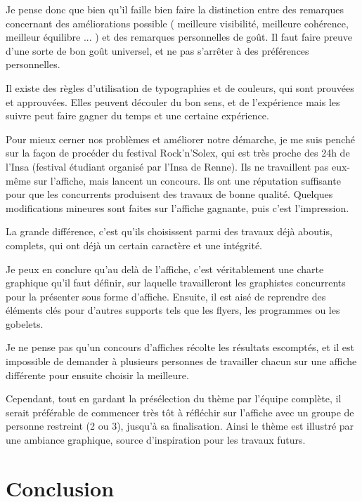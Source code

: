         Je pense donc que bien qu'il faille bien faire la distinction entre des remarques concernant des améliorations possible ( meilleure visibilité, meilleure cohérence, meilleur équilibre ... ) et des remarques personnelles de goût.
        Il faut faire preuve d'une sorte de bon goût universel, et ne pas s'arrêter à des préférences personnelles.
        
        Il existe des règles d'utilisation de typographies et de couleurs, qui sont prouvées  et approuvées. Elles peuvent découler du bon sens, et de l'expérience mais les suivre peut faire gagner du temps et une certaine expérience.

        
        Pour mieux cerner nos problèmes et améliorer notre démarche, je me suis penché sur la façon de procéder du festival Rock'n'Solex, qui est très proche des 24h de l'Insa (festival étudiant organisé par l'Insa de Renne).
        Ils ne travaillent pas eux-même sur l'affiche, mais lancent un concours. Ils ont une réputation suffisante pour que les concurrents produisent des travaux de bonne qualité.
        Quelques modifications mineures sont faites sur l'affiche gagnante, puis c'est l'impression.
        
        La grande différence, c'est qu'ils choisissent parmi des travaux déjà aboutis, complets, qui ont déjà un certain caractère et une intégrité. 
        
        Je peux en conclure qu'au delà de l'affiche, c'est véritablement une charte graphique qu'il faut définir, sur laquelle travailleront les graphistes concurrents pour la présenter sous forme d'affiche. Ensuite, il est aisé de reprendre des éléments clés pour d'autres supports tels que les flyers, les programmes ou les gobelets.
        
        Je ne pense pas qu'un concours d'affiches récolte les résultats escomptés, et il est impossible de demander à plusieurs personnes de travailler chacun sur une affiche différente pour ensuite choisir la meilleure.

        Cependant, tout en gardant la présélection du thème par l'équipe complète, il serait préférable de commencer très tôt à réfléchir sur l'affiche avec un groupe de personne restreint (2 ou 3), jusqu'à sa finalisation. Ainsi le thème est illustré par une ambiance graphique, source d'inspiration pour les travaux futurs.
        
\section{Conclusion}

